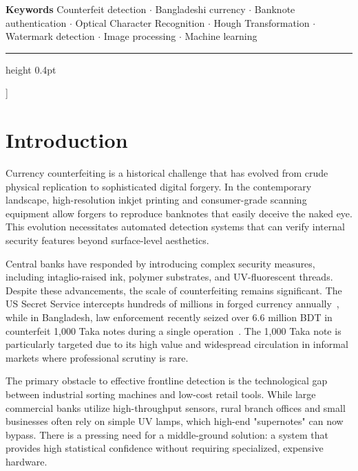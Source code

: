 \documentclass[10pt,a4paper,twocolumn,twoside]{article}
\begin{document}
{\begin{center}
\vspace{5pt}

\begin{minipage}{0.98\linewidth}
\small
\textbf{Keywords}\quad
Counterfeit detection $\cdot$
Bangladeshi currency $\cdot$
Banknote authentication $\cdot$
Optical Character Recognition $\cdot$
Hough Transformation $\cdot$
Watermark detection $\cdot$
Image processing $\cdot$
Machine learning
\end{minipage}

\vspace{8pt}
\hrule height 0.4pt
\vspace{8pt}

\end{center}
}]%

\thispagestyle{plain}

\section{Introduction}
\label{sec:intro}

Currency counterfeiting is a historical challenge that has evolved from crude physical replication to sophisticated digital forgery. In the contemporary landscape, high-resolution inkjet printing and consumer-grade scanning equipment allow forgers to reproduce banknotes that easily deceive the naked eye. This evolution necessitates automated detection systems that can verify internal security features beyond surface-level aesthetics.

Central banks have responded by introducing complex security measures, including intaglio-raised ink, polymer substrates, and UV-fluorescent threads. Despite these advancements, the scale of counterfeiting remains significant. The US Secret Service intercepts hundreds of millions in forged currency annually~\cite{usss2022}, while in Bangladesh, law enforcement recently seized over 6.6 million BDT in counterfeit 1,000 Taka notes during a single operation~\cite{bdnews2016}. The 1,000 Taka note is particularly targeted due to its high value and widespread circulation in informal markets where professional scrutiny is rare.

The primary obstacle to effective frontline detection is the technological gap between industrial sorting machines and low-cost retail tools. While large commercial banks utilize high-throughput sensors, rural branch offices and small businesses often rely on simple UV lamps, which high-end "supernotes" can now bypass. There is a pressing need for a middle-ground solution: a system that provides high statistical confidence without requiring specialized, expensive hardware.
\end{document}
